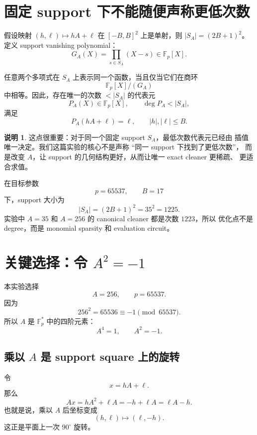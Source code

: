 \documentclass[11pt,a4paper]{ctexart}
\newcommand{\Fp}{\mathbb{F}_p}
\theoremstyle{definition}
\newtheorem{remark}{说明}
\begin{document}
\section{固定 support 下不能随便声称更低次数}

假设映射 $(h,\ell)\mapsto hA+\ell$ 在 $[-B,B]^2$ 上是单射，则
$|S_A|=(2B+1)^2$。定义 support vanishing polynomial：
\[
  G_A(X)=\prod_{s\in S_A}(X-s)\in \Fp[X].
\]

任意两个多项式在 $S_A$ 上表示同一个函数，当且仅当它们在商环
\[
  \Fp[X]/(G_A)
\]
中相等。因此，存在唯一的次数 $<|S_A|$ 的代表元
\[
  P_A(X)\in \Fp[X],\qquad \deg P_A<|S_A|,
\]
满足
\[
  P_A(hA+\ell)=\ell,\qquad |h|,|\ell|\le B.
\]

\begin{remark}
这点很重要：对于同一个固定 support $S_A$，最低次数代表元已经由
插值唯一决定。我们这篇实验的核心不是声称 ``同一 support 下找到了更低次数''，
而是改变 $A$，让 support 的几何结构更好，从而让唯一 exact cleaner 更稀疏、
更适合求值。
\end{remark}

在目标参数
\[
  p=65537,\qquad B=17
\]
下，support 大小为
\[
  |S_A|=(2B+1)^2=35^2=1225.
\]
实验中 $A=35$ 和 $A=256$ 的 canonical cleaner 都是次数 $1223$，所以
优化点不是 degree，而是 monomial sparsity 和 evaluation circuit。

\section{关键选择：令 $A^2=-1$}

本实验选择
\[
  A=256,\qquad p=65537.
\]
因为
\[
  256^2=65536\equiv -1\pmod{65537}.
\]
所以 $A$ 是 $\Fp^\ast$ 中的四阶元素：
\[
  A^4=1,\qquad A^2=-1.
\]

\subsection{乘以 $A$ 是 support square 上的旋转}

令
\[
  x=hA+\ell.
\]
那么
\[
  Ax=hA^2+\ell A=-h+\ell A=\ell A-h.
\]
也就是说，乘以 $A$ 后坐标变成
\[
  (h,\ell)\longmapsto(\ell,-h).
\]
这正是平面上一次 $90^\circ$ 旋转。

\begin{center}
\end{center}
\end{document}
